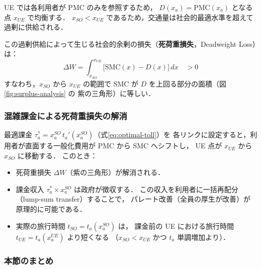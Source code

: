 UE では各利用者が PMC のみを参照するため，
$D(x_a) = \text{PMC}(x_a)$ となる点 $x_{UE}$ で均衡する．
$x_{SO} < x_{UE}$ であるため，交通量は社会的最適水準を超えて過剰に供給される．

この過剰供給によって生じる社会的余剰の損失（\textbf{死荷重損失}，Deadweight Loss）は：
\begin{equation}
  \Delta W
  = \int_{x_{SO}}^{x_{UE}} \bigl[\text{SMC}(x) - D(x)\bigr]\,dx
  \quad > 0
  \label{eq:dwl}
\end{equation}
すなわち，$x_{SO}$ から $x_{UE}$ の範囲で SMC が $D$ を上回る部分の面積（図\ref{fig:surplus-analysis} の
紫の三角形）に等しい．

\subsubsection*{混雑課金による死荷重損失の解消}

最適課金 $\tau_a^* = x_a^{SO}\, t_a'(x_a^{SO})$（式\eqref{eq:optimal-toll}）を
各リンクに設定すると，利用者が直面する一般化費用が PMC から SMC へシフトし，
UE 点が $x_{UE}$ から $x_{SO}$ に移動する．
このとき：

\begin{itemize}
  \item 死荷重損失 $\Delta W$（紫の三角形）が解消される．
  \item 課金収入 $\tau_a^* \times x_a^{SO}$ は政府が徴収する．
        この収入を利用者に一括再配分（lump-sum transfer）することで，
        パレート改善（全員の厚生が改善）が原理的に可能である．
  \item 実際の旅行時間 $t_{SO} = t_a(x_a^{SO})$ は，
        課金前の UE における旅行時間 $t_{UE} = t_a(x_a^{UE})$ より短くなる
        （$x_{SO} < x_{UE}$ かつ $t_a$ 単調増加より）．
\end{itemize}

\subsubsection*{本節のまとめ}

